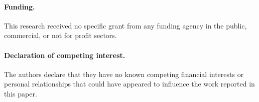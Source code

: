 \documentclass[a4paper,fleqn]{cas-sc}
\begin{document}
\paragraph{Funding.} This research received no specific grant from any funding agency in the public, commercial, or not for profit sectors.

\paragraph{Declaration of competing interest.} The authors declare that they have no known competing financial interests or personal relationships that could have appeared to influence the work reported in this paper.

\printcredits

\newpage


\end{document}
